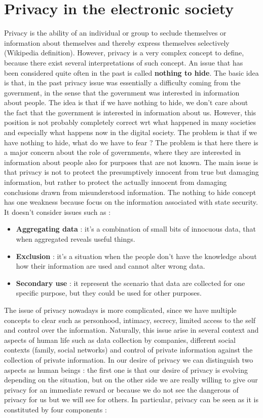 \section{Privacy in the electronic society}
Privacy is the ability of an individual or group to seclude themselves or information about themselves and thereby express themselves selectively (Wikipedia definition). However, privacy is a very complex concept to define, because there exist several interpretations of such concept. An issue that has been considered quite often in the past is called \textbf{nothing to hide}. The basic idea is that, in the past privacy issue was essentially a difficulty coming from the government, in the sense that the government was interested in information about people. The idea is that if we have nothing to hide, we don't care about the fact that the government is interested in information about us. However, this position is not probably completely correct wrt what happened in many societies and especially what happens now in the digital society. The problem is that if we have nothing to hide, what do we have to fear ? The problem is that here there is a major concern about the role of governments, where they are interested in information about people also for purposes that are not known. The main issue is that privacy is not to protect the presumptively innocent from true but damaging information, but rather to protect the actually innocent from damaging conclusions drawn from misunderstood information. The nothing to hide concept has one weakness because focus on the information associated with state security. It doesn't consider issues such as :
\begin{itemize}
\item \textbf{Aggregating data} : it's a combination of small bits of innocuous data, that when aggregated reveals useful things.
\item \textbf{Exclusion} : it's a situation when the people don't have the knowledge about how their information are used and cannot alter wrong data.
\item \textbf{Secondary use} : it represent the scenario that data are collected for one specific purpose, but they could be used for other purposes.
\end{itemize}
The issue of privacy nowadays is more complicated, since we have multiple concepts to clear such as personhood, intimacy, secrecy, limited access to the self and control over the information. Naturally, this issue arise in several context and aspects of human life such as data collection by companies, different social contexts (family, social networks) and control of private information against the collection of private information. In our desire of privacy we can distinguish two aspects as human beings : the first one is that our desire of privacy is evolving depending on the situation, but on the other side we are really willing to give our privacy for an immediate reward or because we do not see the dangerous of privacy for us but we will see for others. In particular, privacy can be seen as it is constituted by four components :
